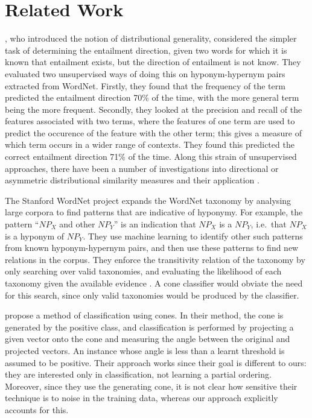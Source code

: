 
\section{Related Work}

, who introduced the notion of distributional
generality, considered the simpler task of determining the entailment
direction, given two words for which it is known that entailment
exists, but the direction of entailment is not know. They evaluated
two unsupervised ways of doing this on hyponym-hypernym pairs
extracted from WordNet. Firstly, they found that the frequency of the
term predicted the entailment direction 70\% of the time, with the
more general term being the more frequent. Secondly, they looked at
the precision and recall of the features associated with two terms,
where the features of one term are used to predict the occurence of
the feature with the other term; this gives a measure of which term
occurs in a wider range of contexts. They found this predicted the
correct entailment direction 71\% of the time. Along this strain of
unsupervised approaches, there have been a number of investigations
into directional or asymmetric distributional similarity measures and
their application
\cite{Geffet:05,Bhagat:07,Szpektor:08,Clarke:09,Kotlerman:10}.

The Stanford WordNet project \cite{Snow:04} expands the WordNet
taxonomy by analysing large corpora to find patterns that are
indicative of hyponymy. For example, the pattern ``$\mathit{NP}_X$ and
other $\mathit{NP}_Y$'' is an indication that $\mathit{NP}_X$ is a
$\mathit{NP}_Y$, i.e.~that $\mathit{NP}_X$ is a hyponym of
$\mathit{NP}_Y$. They use machine learning to identify other such
patterns from known hyponym-hypernym pairs, and then use these
patterns to find new relations in the corpus. They enforce the
transitivity relation of the taxonomy by only searching over valid
taxonomies, and evaluating the likelihood of each taxonomy given the
available evidence \cite{Snow:06}. A cone classifier would obviate the
need for this search, since only valid taxonomies would be produced by
the classifier.

 propose a method of classification using
cones. In their method, the cone is generated by the positive class,
and classification is performed by projecting a given vector onto the
cone and measuring the angle between the original and projected
vectors. An instance whose angle is less than a learnt threshold is
assumed to be positive. Their approach works since their goal is
different to ours: they are interested only in classification, not
learning a partial ordering. Moreover, since they use the generating
cone, it is not clear how sensitive their technique is to noise in the
training data, whereas our approach explicitly accounts for this.
